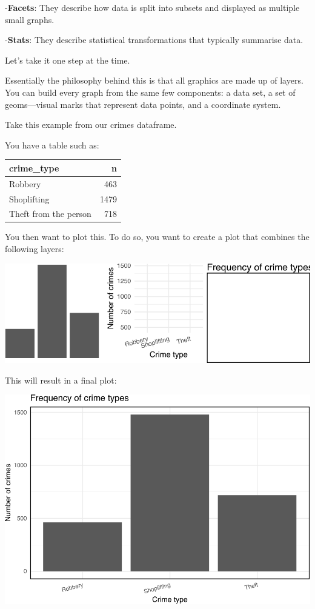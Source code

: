 \documentclass[
]{book}
\begin{document}
-\textbf{Facets}: They describe how data is split into subsets and displayed as multiple small graphs.

-\textbf{Stats}: They describe statistical transformations that typically summarise data.

Let's take it one step at the time.

Essentially the philosophy behind this is that all graphics are made up of layers. You can build every graph from the same few components: a data set, a set of geoms---visual marks that represent data points, and a coordinate system.

Take this example from our crimes dataframe.

You have a table such as:

\begin{tabular}{l|r}
\hline
crime\_type & n\\
\hline
Robbery & 463\\
\hline
Shoplifting & 1479\\
\hline
Theft from the person & 718\\
\hline
\end{tabular}

You then want to plot this. To do so, you want to create a plot that combines the following layers:

\includegraphics{crime_mapping_files/figure-latex/unnamed-chunk-5-1.pdf}

This will result in a final plot:

\includegraphics{crime_mapping_files/figure-latex/unnamed-chunk-6-1.pdf}
\end{document}
